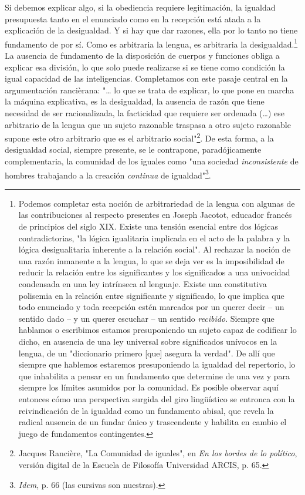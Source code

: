 \documentclass{book}
\begin{document}
Si debemos explicar algo, si la obediencia requiere legitimación, la
igualdad presupuesta tanto en el enunciado como en la recepción está
atada a la explicación de la desigualdad. Y si hay que dar razones, ella
por lo tanto no tiene fundamento de por sí. Como es arbitraria la
lengua, es arbitraria la desigualdad.\footnote{Podemos completar esta
  noción de arbitrariedad de la lengua con algunas de las contribuciones
  al respecto presentes en Joseph Jacotot, educador francés de
  principios del siglo XIX. Existe una tensión esencial entre dos
  lógicas contradictorias, "la lógica igualitaria implicada en el acto
  de la palabra y la lógica desigualitaria inherente a la relación
  social". Al rechazar la noción de una razón inmanente a la lengua, lo
  que se deja ver es la imposibilidad de reducir la relación entre los
  significantes y los significados a una univocidad condensada en una
  ley intrínseca al lenguaje. Existe una constitutiva polisemia en la
  relación entre significante y significado, lo que implica que todo
  enunciado y toda recepción estén marcados por un querer decir -- un
  sentido dado -- y un querer escuchar -- un sentido \emph{recibido}.
  Siempre que hablamos o escribimos estamos presuponiendo un sujeto
  capaz de codificar lo dicho, en ausencia de una ley universal sobre
  significados unívocos en la lengua, de un "diccionario primero
  {[}que{]} asegura la verdad". De allí que siempre que hablemos
  estaremos presuponiendo la igualdad del repertorio, lo que inhabilita
  a pensar en un fundamento que determine de una vez y para siempre los
  límites asumidos por la comunidad. Es posible observar aquí entonces
  cómo una perspectiva surgida del giro lingüístico se entronca con la
  reivindicación de la igualdad como un fundamento abisal, que revela la
  radical ausencia de un fundar único y trascendente y habilita en
  cambio el juego de fundamentos contingentes.} La ausencia de
fundamento de la disposición de cuerpos y funciones obliga a explicar
esa división, lo que solo puede realizarse si se tiene como condición la
igual capacidad de las inteligencias. Completamos con este pasaje
central en la argumentación rancièrana: "\ldots{} lo que se trata de
explicar, lo que pone en marcha la máquina explicativa, es la
desigualdad, la ausencia de razón que tiene necesidad de ser
racionalizada, la facticidad que requiere ser ordenada (\dots) ese
arbitrario de la lengua que un sujeto razonable traspasa a otro sujeto
razonable supone este otro arbitrario que es el arbitrario
social"\footnote{Jacques Rancière, "La Comunidad de iguales", en
  \emph{En los bordes de lo político}, versión digital de la Escuela de
  Filosofía Universidad ARCIS, p. 65.}. De esta forma, a la desigualdad
social, siempre presente, se le contrapone, paradójicamente
complementaria, la comunidad de los iguales como "una sociedad
\emph{inconsistente} de hombres trabajando a la creación \emph{continua}
de igualdad"\footnote{\emph{Idem}, p. 66 (las cursivas son nuestras).}.
\end{document}
